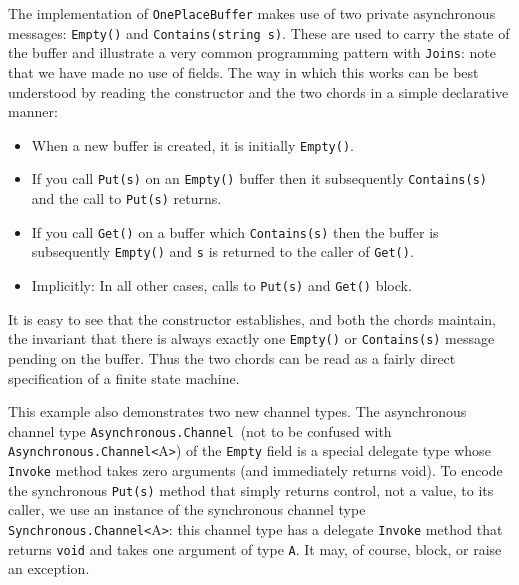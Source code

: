 \documentclass{article}
\newcommand{\joins}{{\texttt{Joins}}}
\newcommand{\dasync}{{\texttt{Asynchronous.Channel}}}
\newcommand{\dasyncA}[1]{{\texttt{Asynchronous.Channel<}#1\texttt{>}}}
\newcommand{\dsyncvoidA}[1]{{\texttt{Synchronous.Channel<}#1\texttt{>}}}
\begin{document}
The implementation of \verb|OnePlaceBuffer| makes use of two private
asynchronous messages: \verb|Empty()| and \verb|Contains(string s)|. These are
used to carry the state of the buffer and illustrate a very common
programming pattern with \joins: note that we have made no use of
fields. The way in which this works can be best understood by reading
the constructor and the two chords in a simple declarative manner:
\begin{itemize}
\item When a new buffer is created, it is initially \verb|Empty()|. 
\item If you call \verb|Put(s)| on an \verb|Empty()| buffer then it subsequently \verb|Contains(s)| and the call to \verb|Put(s)| returns. 
\item If you call \verb|Get()| on a buffer which \verb|Contains(s)| then the buffer is subsequently \verb|Empty()| and \verb|s| is returned to the caller of \verb|Get()|. 
\item Implicitly: In all other cases, calls to \verb|Put(s)| and \verb|Get()| block. 
\end{itemize}
It is easy to see that the constructor establishes, and both the
chords maintain, the invariant that there is always exactly one
\verb|Empty()| or \verb|Contains(s)| message pending on the
buffer. Thus the two chords can be read as a fairly direct
specification of a finite state machine.

This example also demonstrates two new channel types.  The
asynchronous channel type \dasync\ (not to be confused with
\dasyncA{A}) of the \verb+Empty+ field is a special delegate type whose
\verb+Invoke+ method takes zero arguments (and immediately returns void).  To encode the synchronous
\verb+Put(s)+ method that simply
returns control, not a value, to its caller, we use an instance of the synchronous
channel type \dsyncvoidA{A}: this channel type has a delegate \verb+Invoke+
method that returns \verb+void+ and takes one argument of type \verb+A+. 
It may, of course, block, or raise an exception.



\end{document}
